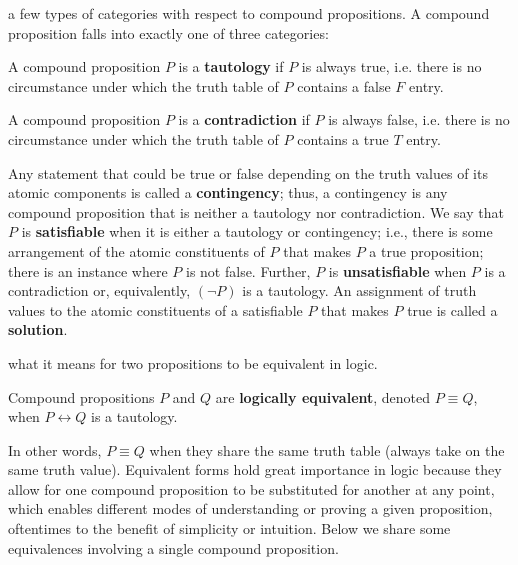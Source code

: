          a few types of categories with respect to compound propositions. A compound proposition falls into exactly one of three categories:

        \begin{definition}[Tautology]\label{def:tautology}
            A compound proposition $P$ is a \textbf{tautology} if $P$ is always true, i.e. there is no circumstance under which the truth table of $P$ contains a false $F$ entry.
        \end{definition}
        
        \begin{definition}[Contradiction]\label{def:contradiction}
            A compound proposition $P$ is a \textbf{contradiction} if $P$ is always false, i.e. there is no circumstance under which the truth table of $P$ contains a true $T$ entry.
        \end{definition}

        Any statement that could be true or false depending on the truth values of its atomic components is called a \textbf{contingency}; thus, a contingency is any compound proposition that is neither a tautology nor contradiction. We say that $P$ is \textbf{satisfiable} when it is either a tautology or contingency; i.e., there is some arrangement of the atomic constituents of $P$ that makes $P$ a true proposition; there is an instance where $P$ is not false. Further, $P$ is \textbf{unsatisfiable} when $P$ is a contradiction or, equivalently, $(\neg P)$ is a tautology. An assignment of truth values to the atomic constituents of a satisfiable $P$ that makes $P$ true is called a \textbf{solution}.

         what it means for two propositions to be equivalent in logic.

        \begin{definition}\label{def:logeq}
            Compound propositions $P$ and $Q$ are \textbf{logically equivalent}, denoted $P \equiv Q$, when $P \longleftrightarrow Q$ is a tautology.
        \end{definition}

        In other words, $P \equiv Q$ when they share the same truth table (always take on the same truth value). Equivalent forms hold great importance in logic because they allow for one compound proposition to be substituted for another at any point, which enables different modes of understanding or proving a given proposition, oftentimes to the benefit of simplicity or intuition. Below we share some equivalences involving a single compound proposition.  

